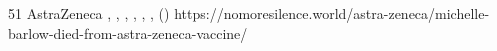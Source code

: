           {}
          {51}
          {AstraZeneca}
          {}
          {
            ,
            ,
            ,
            ,
            ,
            ,
             ()
          }
          {https://nomoresilence.world/astra-zeneca/michelle-barlow-died-from-astra-zeneca-vaccine/}


